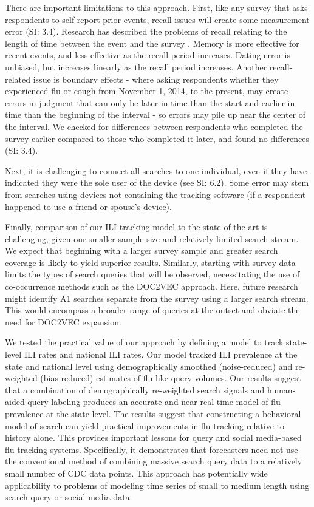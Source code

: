 \documentclass[fleqn,10pt]{wlscirep}
\begin{document}
There are important limitations to this approach. First, like any survey that asks respondents to self-report prior events, recall issues will create some measurement error (SI: 3.4). Research has described the problems of recall relating to the length of time between the event and the survey \cite{rubin1989telescoping}. Memory is more effective for recent events, and less effective as the recall period increases. Dating error is unbiased, but increases linearly as the recall period increases. Another recall-related issue is boundary effects - where asking respondents whether they experienced flu or cough from November 1, 2014, to the present, may create errors in judgment that can only be later in time than the start and earlier in time than the beginning of the interval - so errors may pile up near the center of the interval. We checked for differences between respondents who completed the survey earlier compared to those who completed it later, and found no differences (SI: 3.4).

Next, it is challenging to connect all searches to one individual, even if they have indicated they were the sole user of the device (see SI: 6.2). Some error may stem from searches using devices not containing the tracking software (if a respondent happened to use a friend or spouse's device).

Finally, comparison of our ILI tracking model to the state of the art is challenging, given our smaller sample size and relatively limited search stream. We expect that beginning with a larger survey sample and greater search coverage is likely to yield superior results. Similarly, starting with survey data limits the types of search queries that will be observed, necessitating the use of co-occurrence methods such as the DOC2VEC approach. Here, future research might identify A1 searches separate from the survey using a larger search stream. This would encompass a broader range of queries at the outset and obviate the need for DOC2VEC expansion.

We tested the practical value of our approach by defining a model to track state-level ILI rates and national ILI rates. Our model tracked ILI prevalence at the state and national level using demographically smoothed (noise-reduced) and re-weighted (bias-reduced) estimates of flu-like query volumes. Our results suggest that a combination of demographically re-weighted search signals and human-aided query labeling produces an accurate and near real-time model of flu prevalence at the state level. The results suggest that constructing a behavioral model of search can yield practical improvements in flu tracking relative to history alone. This provides important lessons for query and social media-based flu tracking systems. Specifically, it demonstrates that forecasters need not use the conventional method of combining massive search query data to a relatively small number of CDC data points. This approach has potentially wide applicability to problems of modeling time series of small to medium length using search query or social media data.
\end{document}
